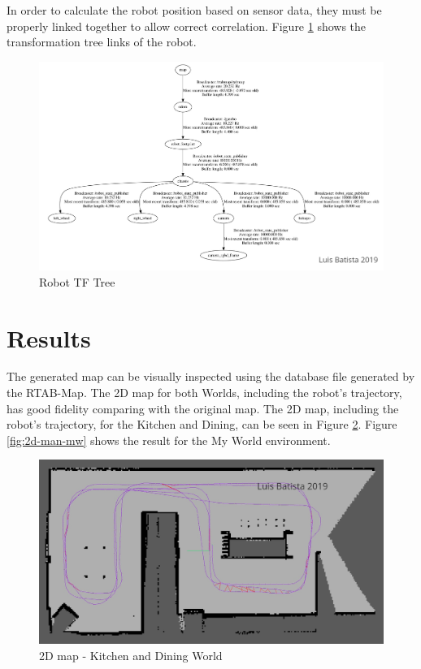 \documentclass[10pt,journal,compsoc]{IEEEtran}
\begin{document}
In order to calculate the robot position based on sensor data, they must be properly linked together to allow correct correlation. Figure \ref{fig:robot-tf-tree} shows the transformation tree links of the robot.

\begin{figure}[H]
  \includegraphics[width=\linewidth]{robot_tf_tree.png}
  \caption{Robot TF Tree}
  \label{fig:robot-tf-tree}
\end{figure}


\section{Results}


The generated map can be visually inspected using the database file generated by the RTAB-Map. The 2D map for both Worlds, including the robot's trajectory, has good fidelity comparing with the original map. The 2D map, including the robot's trajectory, for the Kitchen and Dining, can be seen in Figure \ref{fig:2d-map-kd}. Figure \ref{fig:2d-man-mw} shows the result for the My World environment.

\begin{figure}[H]
  \centering
  \includegraphics[width=.9\linewidth]{kd_world_2d.png}
  \caption{2D map - Kitchen and Dining World}
  \label{fig:2d-map-kd}
\end{figure}
\end{document}
